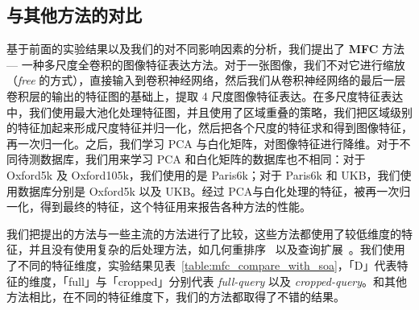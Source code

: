 \subsection{与其他方法的对比} \label{subsec:mfc_compare_soa}
基于前面的实验结果以及我们的对不同影响因素的分析，我们提出了 \textbf{MFC} 方法 --- 一种多尺度全卷积的图像特征表达方法。对于一张图像，我们不对它进行缩放（\emph{free} 的方式），直接输入到卷积神经网络，然后我们从卷积神经网络的最后一层卷积层的输出的特征图的基础上，提取 4 尺度图像特征表达。在多尺度特征表达中，我们使用最大池化处理特征图，并且使用了区域重叠的策略，我们把区域级别的特征加起来形成尺度特征并归一化，然后把各个尺度的特征求和得到图像特征，再一次归一化。之后，我们学习 PCA 与白化矩阵，对图像特征进行降维。对于不同待测数据库，我们用来学习 PCA 和白化矩阵的数据库也不相同：对于 Oxford5k 及 Oxford105k，我们使用的是 Paris6k；对于 Paris6k 和 UKB，我们使用数据库分别是 Oxford5k 以及 UKB。经过 PCA与白化处理的特征，被再一次归一化，得到最终的特征，这个特征用来报告各种方法的性能。

我们把提出的方法与一些主流的方法进行了比较，这些方法都使用了较低维度的特征，并且没有使用复杂的后处理方法，如几何重排序~\cite{Philbin2007ObjectRW} 以及查询扩展~\cite{Chum2007TotalRA}。我们使用了不同的特征维度，实验结果见表~\ref{table:mfc_compare_with_soa}，「D」代表特征的维度，「full」与「cropped」分别代表 \emph{full-query} 以及 \emph{cropped-query}。和其他方法相比，在不同的特征维度下，我们的方法都取得了不错的结果。


